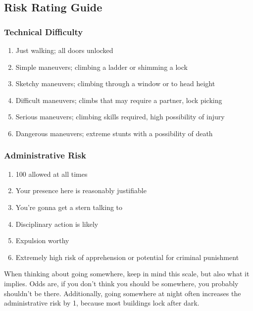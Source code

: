 \documentclass{article}
\begin{document}
  \subsection{Risk Rating Guide}
  \begin{multicols}{2}
  \noindent
  \subsubsection*{Technical Difficulty}
  \begin{enumerate}
    \item [(1)] Just walking; all doors unlocked
    \item [(2)] Simple maneuvers; climbing a ladder or shimming a lock
    \item [(3)] Sketchy maneuvers; climbing through a window or to head height
    \item [(4)] Difficult maneuvers; climbs that may require a partner, lock picking
    \item [(5)] Serious maneuvers; climbing skills required, high possibility of injury
    \item [(6)] Dangerous maneuvers; extreme stunts with a possibility of death

  \end{enumerate}
  \subsubsection*{Administrative Risk}
  \begin{enumerate}
    \item [(A)] 100 allowed at all times
    \item [(B)] Your presence here is reasonably justifiable
    \item [(C)] You’re gonna get a stern talking to
    \item [(D)] Disciplinary action is likely
    \item [(E)] Expulsion worthy
    \item [(F)] Extremely high risk of apprehension or potential for criminal punishment
  \end{enumerate}
  \end{multicols}
  

  When thinking about going somewhere, keep in mind this scale, but also what it implies. Odds are, if you don't think you should be somewhere, you probably shouldn't be there. Additionally, going somewhere at night often increases the administrative risk by 1, because most buildings lock after dark.
  
\end{document}
